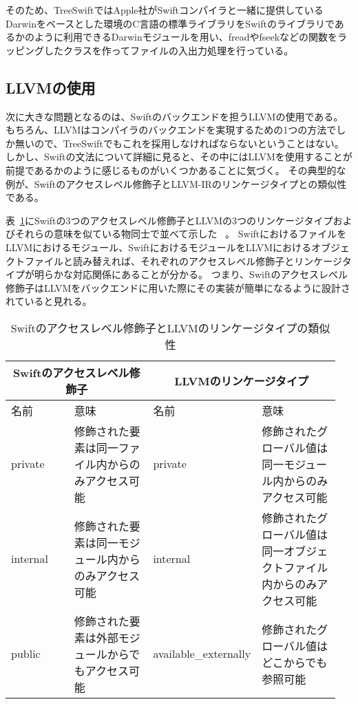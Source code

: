 そのため、TreeSwiftではApple社がSwiftコンパイラと一緒に提供しているDarwinをベースとした環境のC言語の標準ライブラリをSwiftのライブラリであるかのように利用できるDarwinモジュールを用い、freadやfseekなどの関数をラッピングしたクラスを作ってファイルの入出力処理を行っている。

\subsection{LLVMの使用}

次に大きな問題となるのは、Swiftのバックエンドを担うLLVMの使用である。
もちろん、LLVMはコンパイラのバックエンドを実現するための1つの方法でしか無いので、TreeSwiftでもこれを採用しなければならないということはない。
しかし、Swiftの文法について詳細に見ると、その中にはLLVMを使用することが前提であるかのように感じるものがいくつかあることに気づく。
その典型的な例が、Swiftのアクセスレベル修飾子とLLVM-IRのリンケージタイプとの類似性である。

表~\ref{table:linkage-access-level}にSwiftの3つのアクセスレベル修飾子とLLVMの3つのリンケージタイプおよびそれらの意味を似ている物同士で並べて示した ~\cite{llvm-man}。
SwiftにおけるファイルをLLVMにおけるモジュール、SwiftにおけるモジュールをLLVMにおけるオブジェクトファイルと読み替えれば、それぞれのアクセスレベル修飾子とリンケージタイプが明らかな対応関係にあることが分かる。
つまり、Swiftのアクセスレベル修飾子はLLVMをバックエンドに用いた際にその実装が簡単になるように設計されていると見れる。

\begin{table}[!hbtp]
    \begin{center}
        \caption{Swiftのアクセスレベル修飾子とLLVMのリンケージタイプの類似性}
        \begin{tabular}{|p{0.2\linewidth}|p{0.275\linewidth}||p{0.2\linewidth}|p{0.275\linewidth}|}
            \hline
            \multicolumn{2}{|c||}{Swiftのアクセスレベル修飾子} & \multicolumn{2}{|c|}{LLVMのリンケージタイプ}\\
            \hline
            名前 & 意味 & 名前 & 意味\\
            \hline
            \hline
            private & 修飾された要素は同一ファイル内からのみアクセス可能 & private & 修飾されたグローバル値は同一モジュール内からのみアクセス可能\\
            \hline
            internal & 修飾された要素は同一モジュール内からのみアクセス可能 & internal & 修飾されたグローバル値は同一オブジェクトファイル内からのみアクセス可能\\
            \hline
            public & 修飾された要素は外部モジュールからでもアクセス可能 & available\_externally& 修飾されたグローバル値はどこからでも参照可能\\
            \hline
        \end{tabular}
        \label{table:linkage-access-level}
    \end{center}
\end{table}

